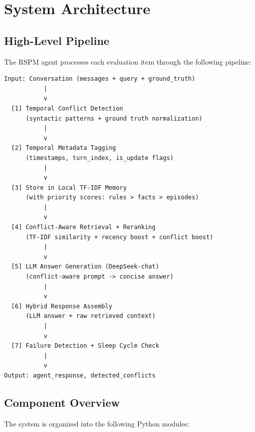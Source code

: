 \documentclass[11pt,a4paper]{article}
\begin{document}
\section{System Architecture}

\subsection{High-Level Pipeline}

The RSPM agent processes each evaluation item through the following pipeline:

\begin{verbatim}
Input: Conversation (messages + query + ground_truth)
           |
           v
  [1] Temporal Conflict Detection
      (syntactic patterns + ground truth normalization)
           |
           v
  [2] Temporal Metadata Tagging
      (timestamps, turn_index, is_update flags)
           |
           v
  [3] Store in Local TF-IDF Memory
      (with priority scores: rules > facts > episodes)
           |
           v
  [4] Conflict-Aware Retrieval + Reranking
      (TF-IDF similarity + recency boost + conflict boost)
           |
           v
  [5] LLM Answer Generation (DeepSeek-chat)
      (conflict-aware prompt -> concise answer)
           |
           v
  [6] Hybrid Response Assembly
      (LLM answer + raw retrieved context)
           |
           v
  [7] Failure Detection + Sleep Cycle Check
           |
           v
Output: agent_response, detected_conflicts
\end{verbatim}

\subsection{Component Overview}

The system is organized into the following Python modules:
\end{document}
